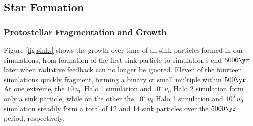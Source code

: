 \subsection{Star Formation}
\subsubsection{Protostellar Fragmentation and Growth}
\label{subsec:sink_formation}

Figure \ref{fig:sinks} shows the growth over time of all sink particles formed in our simulations, from formation of the first sink particle to simulation's end $5000\yr$ later when radiative feedback can no longer be ignored.  Eleven of the fourteen simulations quickly fragment, forming a binary or small multiple within $500\yr$.  At one extreme, the $10\,u_0$ Halo 1 simulation and $10^5\,u_0$ Halo 2 simulation form only a sink particle, while on the other the $10^4\,u_0$ Halo 1 simulation and $10^3\,u_0$ simulation steadily form a total of 12 and 14 sink particles over the $5000\yr$ period, respectively.



